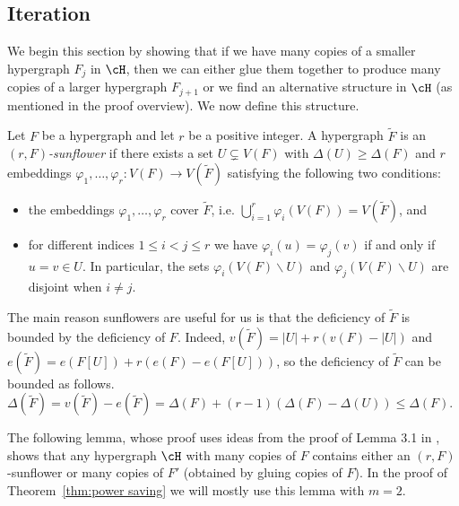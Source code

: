 \subsection{Iteration}\label{subsec:iteration}

We begin this section by showing that if we have many copies of a smaller hypergraph $F_j$ in $\cH$, then we can either glue them together to produce many copies of a larger hypergraph $F_{j+1}$ or  we find an alternative structure in $\cH$ (as mentioned in the proof overview). We now define this structure.

\begin{definition}
Let $F$ be a hypergraph and let $r$ be a positive integer. A hypergraph $\tilde F$ is an \textit{$(r, F)$-sunflower} if there exists a set $U\subsetneq V(F)$ with $\Delta(U)\geq \Delta(F)$ and $r$ embeddings $\varphi_1, \dots, \varphi_r:V(F)\to V(\tilde F)$ satisfying the following two conditions:
\begin{itemize}
    \item[(i)] the embeddings $\varphi_1, \dots, \varphi_r$ cover $\tilde F$, i.e. $\bigcup_{i=1}^r \varphi_i(V(F))=V(\tilde F)$, and 
    \item[(ii)] for different indices $1\leq i<j\leq r$ we have $\varphi_i(u)=\varphi_j(v)$ if and only if $u=v\in U$. In particular, the sets $\varphi_i(V(F)\backslash U)$ and $\varphi_j(V(F)\backslash U)$ are disjoint when $i\neq j$.
\end{itemize}
\end{definition}

The main reason sunflowers are useful for us is that the deficiency of $\tilde F$ is bounded by the deficiency of $F$. Indeed, $v(\tilde F)=|U|+r(v(F)-|U|)$ and $e(\tilde F)=e(F[U])+r(e(F)-e(F[U]))$, so the deficiency of $\tilde F$ can be bounded as follows. $\Delta(\tilde F)=v(\tilde F)-e(\tilde F)=\Delta(F)+(r-1)(\Delta(F)-\Delta(U))\leq \Delta(F)$.

The following lemma, whose proof uses ideas from the proof of Lemma 3.1 in \cite{CGLS23}, shows that any hypergraph $\cH$ with many copies of $F$ contains either an $(r, F)$-sunflower or many copies of $F'$ (obtained by gluing copies of $F$). In the proof of Theorem~\ref{thm:power saving} we will mostly use this lemma with $m=2$.

